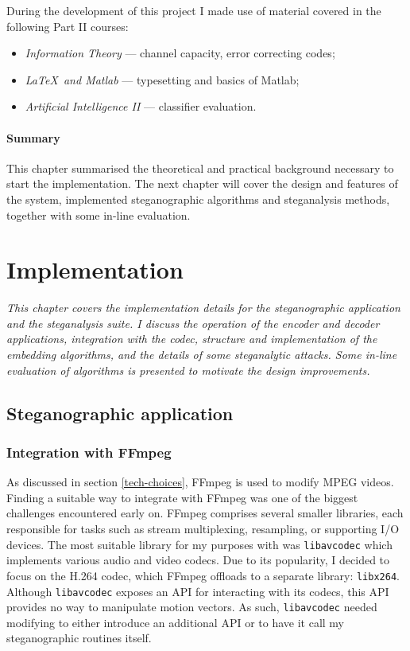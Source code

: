 \documentclass[12pt,british,twoside,notitlepage,usenames,dvipsnames,hypens,final]{report}
\numberwithin{equation}{section}
\numberwithin{figure}{section}
\begin{document}
During the development of this project I made use of material covered in the following Part II courses:
\begin{itemize}
\item \textit{Information Theory} --- channel capacity, error correcting codes;
\item \textit{\LaTeX~and Matlab} --- typesetting and basics of Matlab;
\item \textit{Artificial Intelligence II} --- classifier evaluation.
\end{itemize}

\bigskip
\subsubsection*{Summary}
This chapter summarised the theoretical and practical background necessary to start the implementation. The next chapter will cover the design and features of the system, implemented steganographic algorithms and steganalysis methods, together with some in-line evaluation.

\cleardoublepage
\chapter{Implementation}

\textit{This chapter covers the implementation details for the steganographic application and the steganalysis suite. I discuss the operation of the encoder and decoder applications, integration with the codec, structure and implementation of the embedding algorithms, and the details of some steganalytic attacks. Some in-line evaluation of algorithms is presented to motivate the design improvements.}

\section{Steganographic application}

\subsection{Integration with FFmpeg}
\label{integrate-ffmpeg}

As discussed in section \ref{tech-choices}, FFmpeg is used to modify MPEG videos. Finding a suitable way to integrate with FFmpeg was one of the biggest challenges encountered early on. FFmpeg comprises several smaller libraries, each responsible for tasks such as stream multiplexing, resampling, or supporting I/O devices. The most suitable library for my purposes with was \texttt{libavcodec} which implements various audio and video codecs. Due to its popularity, I decided to focus on the H.264 codec, which FFmpeg offloads to a separate library: \texttt{libx264}. Although \texttt{libavcodec} exposes an API for interacting with its codecs, this API provides no way to manipulate motion vectors. As such, \texttt{libavcodec} needed modifying to either introduce an additional API or to have it call my steganographic routines itself.
\end{document}

